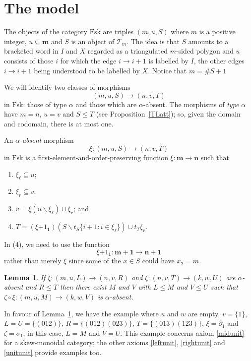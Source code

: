 \documentclass[a4paper,12pt,reqno]{amsart}
\newtheorem{lemma}[theorem]{Lemma}
\theoremstyle{definition}
\theoremstyle{fact}
\theoremstyle{genquest}
\theoremstyle{step}
\newcommand{\lra}{\longrightarrow}
\def\CT{{\mathscr T}}
\begin{document}
\section{The model}
The objects of the category $\mathrm{Fsk}$ are triples $(m,u,S)$ where $m$
is a positive integer,
$u\subseteq \mathbf{m}$ and $S$ is an object of $\CT_m$.
The idea is that $S$ amounts to a bracketed word in $I$ and $X$ regarded
as a triangulated $m$-sided polygon and $u$ consists of those $i$ for which the 
edge $i\lra i+1$ is labelled by $I$, the other edges $i\lra i+1$ 
being understood to be labelled by $X$. Notice that $m=\#S+1$ 

We will identify two classes of morphisms
\begin{equation}
(m,u,S) \lra (n,v,T)
\end{equation}
in $\mathrm{Fsk}$: those of type 
$\alpha$ and those which are $\alpha$-absent.
The morphisms of {\em type} $\alpha$ have $m=n$, $u=v$ and $S\le T$ 
(see Proposition~\ref{TLatt}); so, given the domain and codomain,
there is at most one.

An {\em $\alpha$-absent} morphism
\begin{equation}
\xi : (m,u,S) \lra (n,v,T)
\end{equation}
in $\mathrm{Fsk}$ is a first-element-and-order-preserving function 
$\xi : \mathbf{m} \lra \mathbf{n}$
such that
\begin{enumerate}
\item $\xi_{\ell} \subseteq u$;
\item $\xi_{r} \subseteq v$;
\item $v=\xi(u\smallsetminus \xi_{\ell})\cup \xi_{r}$; and
\item $T=(\xi \mathbf{+}1_{\mathbf{1}}) (S\smallsetminus t_S \{i+1 : i\in \xi_{\ell}\}) \cup t_T \xi_r$.   
\end{enumerate}
In (4), we need to use the function 
$$\xi \mathbf{+}1_{\mathbf{1}} : \mathbf{m+1} \lra \mathbf{n+1}$$
rather than merely $\xi$ since some of the $x\in S$ could have $x_2 = m$.
  
\begin{lemma}\label{absent}
If $\xi : (m,u,L) \lra (n,v,R)$ and $\zeta : (n,v,T) \lra (k,w,U)$ are $\alpha$-absent
and $R\le T$ then there exist $M$ and $V$
with $L\le M$ and $V\le U$ such that 
$\zeta \circ \xi : (m,u,M) \lra (k,w,V)$ is $\alpha$-absent.
\end{lemma}

In favour of Lemma~\ref{absent}, we have the example 
where $u$ and $w$ are empty, $v=\{1\}$, $L=U=\{(012)\}$, 
$R=\{(012)(023)\}$, $T=\{(013)(123)\}$, $\xi = \partial_1$ and $\zeta =\sigma_1$;
in this case, $L=M$ and $V=U$.
This example concerns axiom \eqref{midunit} for a skew-monoidal category; the other axioms
\eqref{leftunit}, \eqref{rightunit} and \eqref{unitunit} provide examples too.  
\end{document}
